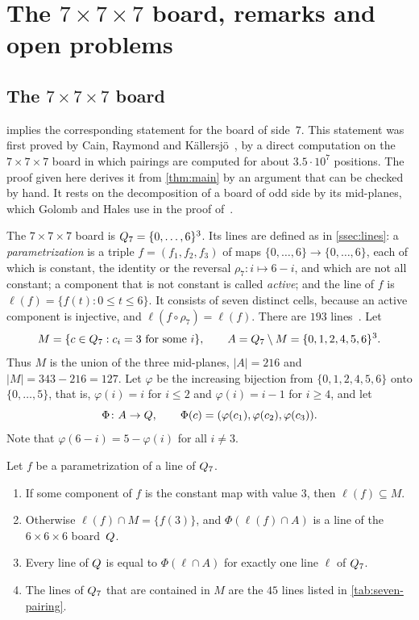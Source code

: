 \section{The \texorpdfstring{$7\times7\times7$}{7x7x7} board, remarks and open
problems}\label{sec:discussion}

\subsection{The \texorpdfstring{$7\times7\times7$}{7x7x7} board}\label{ssec:seven}

 implies the corresponding statement for the board of side~$7$. This statement was first
proved by Cain, Raymond and K\"allersj\"o~\cite{CainRaymondKallersjo2025}, by a direct computation on
the $7\times7\times7$ board in which pairings are computed for about $3.5\cdot 10^7$ positions. The
proof given here derives it from \cref{thm:main} by an argument that can be checked by hand. It rests
on the decomposition of a board of odd side by its mid-planes, which Golomb and Hales use in the proof
of~\cite[Theorem~3]{GolombHales2002}.

The $7\times7\times7$ board is $Q_7=\{0,\dots,6\}^3$. Its lines are defined as in \cref{ssec:lines}:
a \emph{parametrization} is a triple $f=(f_1,f_2,f_3)$ of maps $\{0,\dots,6\}\to\{0,\dots,6\}$, each of
which is constant, the identity or the reversal $\rho_7\colon i\mapsto 6-i$, and which are not all
constant; a component that is not constant is called \emph{active}; and the line of $f$ is
$\ell(f)=\{f(t):0\le t\le 6\}$. It consists of seven distinct cells, because an active component is
injective, and $\ell(f\circ\rho_7)=\ell(f)$. There are $193$ lines~\cite[Theorem~1]{GolombHales2002}.
Let
\[
  M=\{c\in Q_7 : c_i=3 \text{ for some } i\},\qquad A=Q_7\setminus M=\{0,1,2,4,5,6\}^3 .
\]
Thus $M$ is the union of the three mid-planes, $|A|=216$ and $|M|=343-216=127$. Let $\varphi$ be the
increasing bijection from $\{0,1,2,4,5,6\}$ onto $\{0,\dots,5\}$, that is, $\varphi(i)=i$ for $i\le 2$
and $\varphi(i)=i-1$ for $i\ge 4$, and let
\[
  \Phi\colon A\to Q,\qquad \Phi(c)=(\varphi(c_1),\varphi(c_2),\varphi(c_3)).
\]
Note that $\varphi(6-i)=5-\varphi(i)$ for all $i\ne 3$.

\begin{lemma}\label{lem:seven-decomp}
Let $f$ be a parametrization of a line of $Q_7$.
\begin{enumerate}[label=\textup{(\alph*)}]
\item If some component of $f$ is the constant map with value $3$, then $\ell(f)\subseteq M$.
\item Otherwise $\ell(f)\cap M=\{f(3)\}$, and $\Phi(\ell(f)\cap A)$ is a line of the $6\times6\times6$
      board~$Q$.
\item Every line of $Q$ is equal to $\Phi(\ell\cap A)$ for exactly one line $\ell$ of $Q_7$.
\item The lines of $Q_7$ that are contained in $M$ are the $45$ lines listed in
      \cref{tab:seven-pairing}.
\end{enumerate}
\end{lemma}

